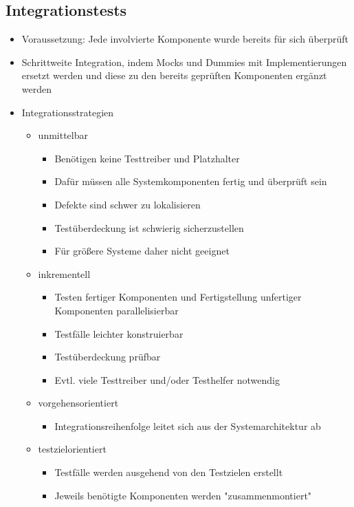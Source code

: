 \documentclass{article}
\begin{document}
\subsection{Integrationstests}
\begin{itemize}
  \item Voraussetzung: Jede involvierte Komponente wurde bereits für sich überprüft
  \item Schrittweite Integration, indem Mocks und Dummies mit Implementierungen ersetzt werden und diese zu den bereits geprüften Komponenten ergänzt werden
  \item Integrationsstrategien
  \begin{itemize}
    \item unmittelbar
    \begin{itemize}
      \item Benötigen keine Testtreiber und Platzhalter
      \item Dafür müssen alle Systemkomponenten fertig und überprüft sein
      \item Defekte sind schwer zu lokalisieren
      \item Testüberdeckung ist schwierig sicherzustellen
      \item Für größere Systeme daher nicht geeignet
    \end{itemize}
    \item inkrementell
    \begin{itemize}
      \item Testen fertiger Komponenten und Fertigstellung unfertiger Komponenten parallelisierbar
      \item Testfälle leichter konstruierbar
      \item Testüberdeckung prüfbar
      \item Evtl. viele Testtreiber und/oder Testhelfer notwendig
    \end{itemize}
    \item vorgehensorientiert
    \begin{itemize}
      \item Integrationsreihenfolge leitet sich aus der Systemarchitektur ab
    \end{itemize}
    \item testzielorientiert
    \begin{itemize}
      \item Testfälle werden ausgehend von den Testzielen erstellt
      \item Jeweils benötigte Komponenten werden "zusammenmontiert"

\end{itemize}
\end{itemize}
\end{itemize}
\end{document}
